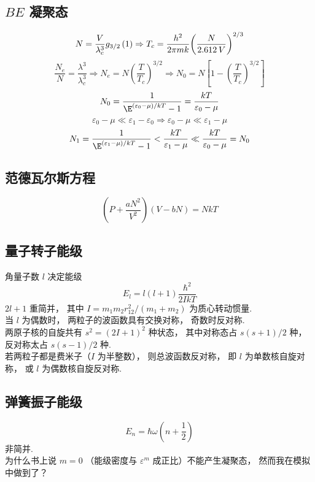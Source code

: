 \subsection{$BE$ 凝聚态}
\begin{equation}
N = \frac{V}{{\lambda_c^3}}{g_{3/2}}\left( 1 \right) \Rightarrow {T_c} = \frac{{{h^2}}}{{2\pi mk}}{\left( {\frac{N}{{2.612{\kern 1pt} {\kern 1pt} V}}} \right)^{2/3}}
\end{equation}
\begin{equation}
\frac{{{N_e}}}{N} = \frac{{{\lambda ^3}}}{{\lambda_c^3}} \Rightarrow {N_e} = N{\left( {\frac{T}{{{T_c}}}} \right)^{3/2}} \Rightarrow {N_0} = N\left[ {1 - {{\left( {\frac{T}{{{T_c}}}} \right)}^{3/2}}} \right]
\end{equation}
\begin{equation}
{N_0} = \frac{1}{{{\E^{({\varepsilon_0} - \mu )/kT}} - 1}} = \frac{{kT}}{{{\varepsilon_0} - \mu }}
\end{equation}
\begin{equation}
{\varepsilon_0} - \mu  \ll {\varepsilon_1} - {\varepsilon_0} \Rightarrow {\varepsilon_0} - \mu  \ll {\varepsilon_1} - \mu 
\end{equation}
\begin{equation}
{N_1} = \frac{1}{{{\E^{({\varepsilon_1} - \mu )/kT}} - 1}} < \frac{{kT}}{{{\varepsilon_1} - \mu }} \ll \frac{{kT}}{{{\varepsilon_0} - \mu }} = {N_0}
\end{equation}
\subsection{范德瓦尔斯方程}
\begin{equation}
\left( {P + \frac{{a{N^2}}}{{{V^2}}}} \right)\left( {V - bN} \right) = NkT
\end{equation}
\subsection{量子转子能级}
角量子数 $l$ 决定能级
\begin{equation}
{E_l} = l\left( {l + 1} \right)\frac{{{\hbar ^2}}}{{2IkT}}
\end{equation}
$2l+1$ 重简并， 其中 $I = {{{m_1}{m_2}r_{12}^2}}/({{{m_1} + {m_2}}})$ 为质心转动惯量.\\
当 $l$ 为偶数时， 两粒子的波函数具有交换对称， 奇数时反对称.\\
两原子核的自旋共有 ${s^2} = {\left( {2I + 1} \right)^2}$ 种状态， 其中对称态占 ${{s\left( {s + 1} \right)}}/{2}$ 种， 反对称太占 ${{s\left( {s - 1} \right)}}/{2}$ 种.\\
若两粒子都是费米子（$I$ 为半整数）， 则总波函数反对称， 即 $l$ 为单数核自旋对称， 或 $l$ 为偶数核自旋反对称.\\
\subsection{弹簧振子能级}
\begin{equation}
{E_n} = \hbar \omega \left( {n + \frac{1}{2}} \right)
\end{equation}
非简并.\\
为什么书上说 $m = 0 $ （能级密度与 ${\varepsilon ^m}$ 成正比）不能产生凝聚态， 然而我在模拟中做到了？\\
